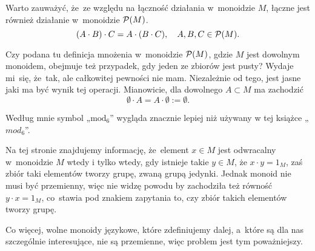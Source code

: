 \documentclass[a4paper,11pt]{article}
\begin{document}
\vspace{\spaceFour}







\start {} Warto zauważyć, że~ze względu na łączność działania
w~monoidzie $M$, łączne jest również działanie w~monoidzie
$\mathcal{P}( M )$.
\begin{equation}
  \label{eq:Forys-Forys-01}
  ( A \cdot B ) \cdot C = A \cdot ( B \cdot C ), \quad
  A, B, C \in \mathcal{P}( M ).
\end{equation}

\vspace{\spaceFour}





\start {} Czy podana tu definicja mnożenia w~monoidzie
$\mathcal{P}( M )$, gdzie $M$ jest dowolnym monoidem, obejmuje też
przypadek, gdy jeden ze zbiorów jest pusty? Wydaje mi~się, że~tak, ale
całkowitej pewności nie mam. Niezależnie od tego, jest jasne jaki ma
być wynik tej operacji. Mianowicie, dla dowolnego $A \subset M$ ma zachodzić
\begin{equation}
  \label{eq:Forys-Forys-02}
  \emptyset \cdot A = A \cdot \emptyset := \emptyset.
\end{equation}

\vspace{\spaceFour}





\start {} Według mnie symbol „$\textrm{mod}_{ 6 }$” wygląda
znacznie lepiej niż używany w tej książce „$mod_{ 6 }$”.

\vspace{\spaceFour}





\start {} Na tej stronie znajdujemy informację, że~element
$x \in M$ jest odwracalny w~monoidzie $M$ wtedy i tylko wtedy, gdy
istnieje takie $y \in M$, że $x \cdot y = 1_{ M }$, zaś zbiór taki
elementów tworzy grupę, zwaną grupą jedynki. Jednak monoid nie musi
być przemienny, więc nie widzę powodu by zachodziła też równość
$y \cdot x = 1_{ M }$, co~stawia pod znakiem zapytania to, czy zbiór
takich elementów tworzy grupę.

Co więcej, wolne monoidy językowe, które zdefiniujemy dalej, a~które
są dla nas szczególnie interesujące, nie są przemienne, więc problem
jest tym poważniejszy.
\end{document}
